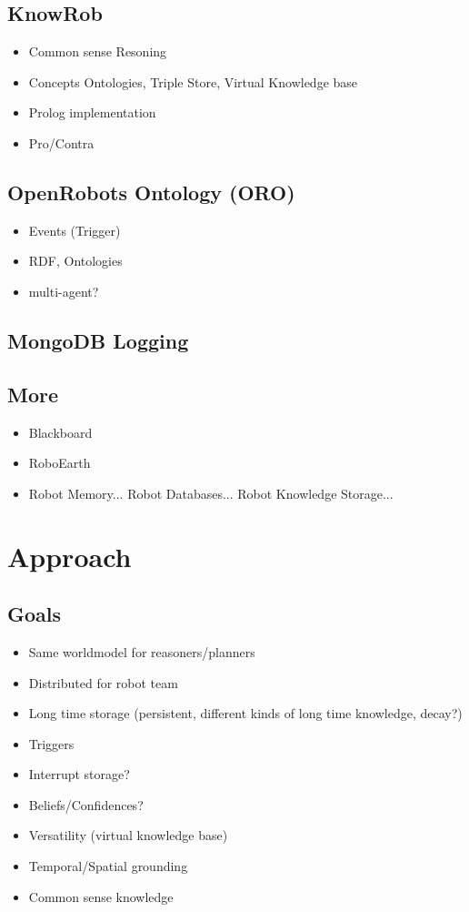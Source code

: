 \documentclass[a4paper,11pt]{article}
\begin{document}
\subsection{KnowRob}
\label{sec:knowrob}
\begin{itemize}
\item Common sense Resoning
\item Concepts Ontologies, Triple Store, Virtual Knowledge base
\item Prolog implementation
\item Pro/Contra
\end{itemize}
\subsection{OpenRobots Ontology (ORO)}
\begin{itemize}
\item Events (Trigger)
\item RDF, Ontologies
\item multi-agent?
\end{itemize}
\subsection{MongoDB Logging}
\label{sec:mongo-logging}
\subsection{More}
\begin{itemize}
\item Blackboard
\item RoboEarth
\item Robot Memory... Robot Databases... Robot Knowledge Storage...
\end{itemize}


\section{Approach}
\label{sec:approach}
\subsection{Goals}
\label{sec:goals}
\begin{itemize}
\item Same worldmodel for reasoners/planners
\item Distributed for robot team
\item Long time storage (persistent, different kinds of long time knowledge, decay?)
\item Triggers
\item Interrupt storage?
\item Beliefs/Confidences?
\item Versatility (virtual knowledge base)
\item Temporal/Spatial grounding
\item Common sense knowledge
\end{itemize}
\end{document}
